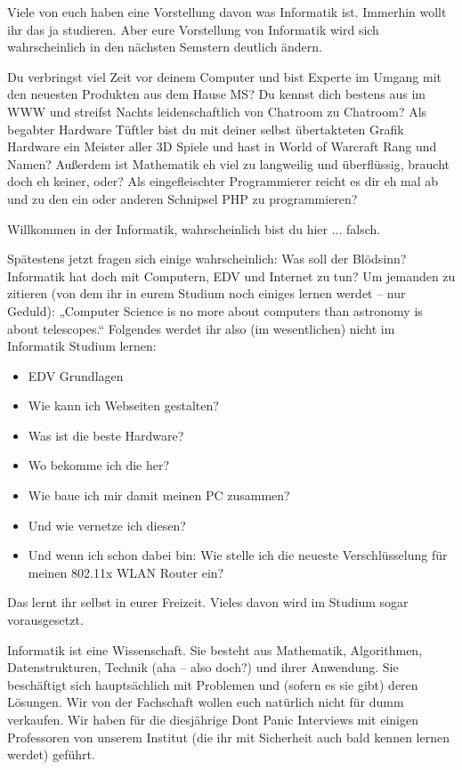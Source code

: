 \spaltenanfang
Viele von euch haben eine Vorstellung davon was Informatik ist. Immerhin wollt ihr das ja studieren. Aber eure Vorstellung von Informatik wird sich wahrscheinlich in den n\"achsten Semstern deutlich \"andern.

Du verbringst viel Zeit vor deinem Computer und bist Experte im Umgang mit den neuesten Produkten aus dem Hause MS? Du kennst dich bestens aus im WWW und streifst Nachts leidenschaftlich von Chatroom zu Chatroom? Als begabter Hardware Tüftler bist du mit deiner selbst übertakteten Grafik Hardware ein Meister aller 3D Spiele und hast in World of Warcraft Rang und Namen? Außerdem ist Mathematik eh viel zu langweilig und überflüssig, braucht doch eh keiner, oder? Als eingefleischter Programmierer reicht es dir eh mal ab und zu den ein oder anderen Schnipsel PHP zu programmieren?

Willkommen in der Informatik, wahrscheinlich bist du hier ... falsch.


Spätestens jetzt fragen sich einige wahrscheinlich: Was soll der Blödsinn? Informatik hat doch mit Computern, EDV und Internet zu tun? Um jemanden zu zitieren (von dem ihr in eurem Studium noch einiges lernen werdet – nur Geduld): „Computer Science is no more about computers than astronomy is about telescopes.“ Folgendes werdet ihr also (im wesentlichen) nicht im Informatik Studium lernen:

\begin{itemize}
     \item EDV Grundlagen
     \item Wie kann ich Webseiten gestalten?
     \item Was ist die beste Hardware?
     \item Wo bekomme ich die her?
     \item Wie baue ich mir damit meinen PC zusammen?
     \item Und wie vernetze ich diesen?
     \item Und wenn ich schon dabei bin: Wie stelle ich die neueste Verschlüsselung für meinen 802.11x WLAN Router ein?
\end{itemize}

Das lernt ihr selbst in eurer Freizeit. Vieles davon wird im Studium sogar vorausgesetzt.

Informatik ist eine Wissenschaft. Sie besteht aus Mathematik, Algorithmen, Datenstrukturen, Technik (aha – also doch?) und ihrer Anwendung. Sie beschäftigt sich hauptsächlich mit Problemen und (sofern es sie gibt) deren Lösungen. Wir von der Fachschaft wollen euch natürlich nicht für dumm verkaufen. Wir haben für die diesjährige Dont Panic Interviews mit einigen Professoren von unserem Institut (die ihr mit Sicherheit auch bald kennen lernen werdet) geführt.


\spaltenende
